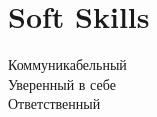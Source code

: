 \documentclass[A4,11pt]{article}
\begin{document}

\section{Soft Skills}
 \begin{itemize}[leftmargin=0.5cm, label={}]
    \small{\item{
     {Коммуникабельный}\\
     {Уверенный в себе}\\
     {Ответственный}
    }}
 \end{itemize}

\end{document}
